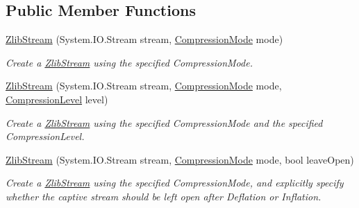 \subsection*{Public Member Functions}
\begin{DoxyCompactItemize}
\item 
\mbox{\hyperlink{class_super_tiled2_unity_1_1_ionic_1_1_zlib_1_1_zlib_stream_a626c8b9a6ae8fffc521a24efc94f6f39}{Zlib\+Stream}} (System.\+I\+O.\+Stream stream, \mbox{\hyperlink{namespace_super_tiled2_unity_1_1_ionic_1_1_zlib_ad5b7635d92497e1c905e5de82eb1c6b1}{Compression\+Mode}} mode)
\begin{DoxyCompactList}\small\item\em Create a {\ttfamily \mbox{\hyperlink{class_super_tiled2_unity_1_1_ionic_1_1_zlib_1_1_zlib_stream}{Zlib\+Stream}}} using the specified {\ttfamily Compression\+Mode}. \end{DoxyCompactList}\item 
\mbox{\hyperlink{class_super_tiled2_unity_1_1_ionic_1_1_zlib_1_1_zlib_stream_ac82888fe6d5881203267034ac30f0b91}{Zlib\+Stream}} (System.\+I\+O.\+Stream stream, \mbox{\hyperlink{namespace_super_tiled2_unity_1_1_ionic_1_1_zlib_ad5b7635d92497e1c905e5de82eb1c6b1}{Compression\+Mode}} mode, \mbox{\hyperlink{namespace_super_tiled2_unity_1_1_ionic_1_1_zlib_a20f6771804996c363f454ad9765cd7db}{Compression\+Level}} level)
\begin{DoxyCompactList}\small\item\em Create a {\ttfamily \mbox{\hyperlink{class_super_tiled2_unity_1_1_ionic_1_1_zlib_1_1_zlib_stream}{Zlib\+Stream}}} using the specified {\ttfamily Compression\+Mode} and the specified {\ttfamily Compression\+Level}. \end{DoxyCompactList}\item 
\mbox{\hyperlink{class_super_tiled2_unity_1_1_ionic_1_1_zlib_1_1_zlib_stream_a959f79e8003e187a7c5ca2b4471ba22f}{Zlib\+Stream}} (System.\+I\+O.\+Stream stream, \mbox{\hyperlink{namespace_super_tiled2_unity_1_1_ionic_1_1_zlib_ad5b7635d92497e1c905e5de82eb1c6b1}{Compression\+Mode}} mode, bool leave\+Open)
\begin{DoxyCompactList}\small\item\em Create a {\ttfamily \mbox{\hyperlink{class_super_tiled2_unity_1_1_ionic_1_1_zlib_1_1_zlib_stream}{Zlib\+Stream}}} using the specified {\ttfamily Compression\+Mode}, and explicitly specify whether the captive stream should be left open after Deflation or Inflation. \end{DoxyCompactList}\item 

\end{DoxyCompactItemize}
